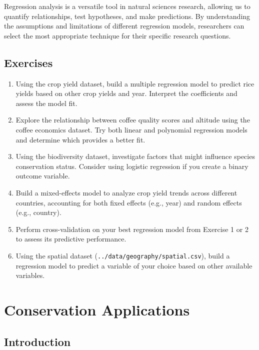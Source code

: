 \documentclass[
  letterpaper,
]{book}
\begin{document}
Regression analysis is a versatile tool in natural sciences research,
allowing us to quantify relationships, test hypotheses, and make
predictions. By understanding the assumptions and limitations of
different regression models, researchers can select the most appropriate
technique for their specific research questions.

\section{Exercises}\label{exercises-7}

\begin{enumerate}
\def\labelenumi{\arabic{enumi}.}
\item
  Using the crop yield dataset, build a multiple regression model to
  predict rice yields based on other crop yields and year. Interpret the
  coefficients and assess the model fit.
\item
  Explore the relationship between coffee quality scores and altitude
  using the coffee economics dataset. Try both linear and polynomial
  regression models and determine which provides a better fit.
\item
  Using the biodiversity dataset, investigate factors that might
  influence species conservation status. Consider using logistic
  regression if you create a binary outcome variable.
\item
  Build a mixed-effects model to analyze crop yield trends across
  different countries, accounting for both fixed effects (e.g., year)
  and random effects (e.g., country).
\item
  Perform cross-validation on your best regression model from Exercise 1
  or 2 to assess its predictive performance.
\item
  Using the spatial dataset (\texttt{../data/geography/spatial.csv}),
  build a regression model to predict a variable of your choice based on
  other available variables.
\end{enumerate}

\chapter{Conservation Applications}\label{conservation-applications}

\section{Introduction}\label{introduction-7}
\end{document}
